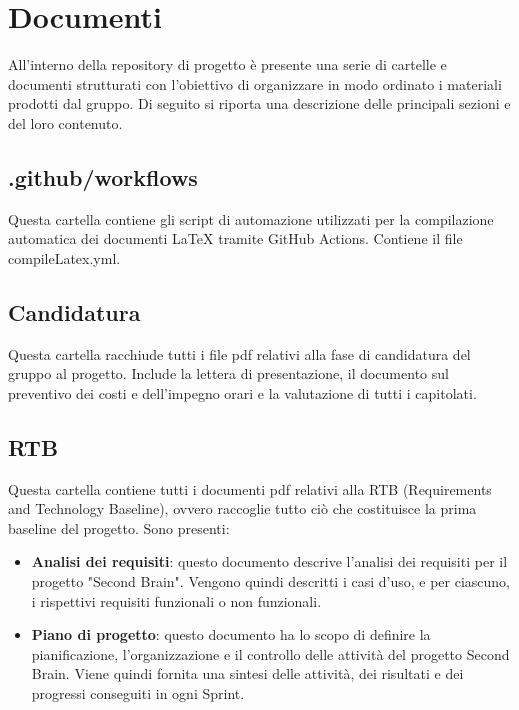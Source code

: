\documentclass[11pt,a4paper]{article}
\begin{document}
\newpage

\section{Documenti}
All’interno della repository di progetto è presente una serie di cartelle e documenti strutturati con l’obiettivo di organizzare in modo ordinato i materiali prodotti dal gruppo. Di seguito si riporta una descrizione delle principali sezioni e del loro contenuto.

\subsection{.github/workflows}
Questa cartella contiene gli script di automazione utilizzati per la compilazione automatica dei documenti LaTeX tramite GitHub Actions. Contiene il file compileLatex.yml.

\subsection{Candidatura}
Questa cartella racchiude tutti i file pdf relativi alla fase di candidatura del gruppo al progetto. Include la lettera di presentazione, il documento sul preventivo dei costi e dell'impegno orari e la valutazione di tutti i capitolati.

\subsection{RTB}
Questa cartella contiene tutti i documenti pdf relativi alla RTB (Requirements and Technology Baseline), ovvero raccoglie tutto ciò che costituisce la prima baseline del progetto. Sono presenti:
\begin{itemize}
\item \textbf{Analisi dei requisiti}: questo documento descrive l'analisi dei requisiti per il progetto "Second Brain". Vengono quindi descritti i casi d'uso, e per ciascuno, i rispettivi requisiti funzionali o non funzionali.
\item \textbf{Piano di progetto}: questo documento ha lo scopo di definire la pianificazione, l’organizzazione e il controllo delle attività del progetto Second Brain. Viene quindi fornita una sintesi delle attività, dei risultati e dei progressi conseguiti in ogni Sprint.
\end{itemize}
\end{document}
